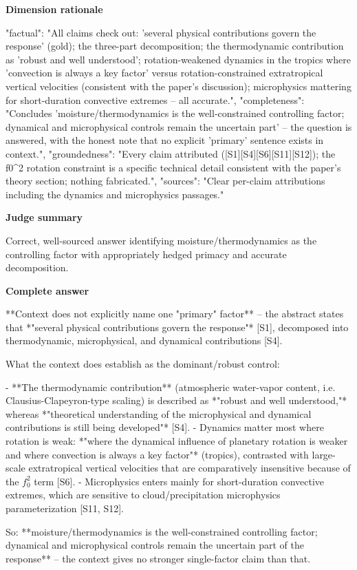 \documentclass[10pt]{article}
\begin{document}
\textbf{Dimension rationale}
\begin{EvidenceText}
{
  "factual": "All claims check out: 'several physical contributions govern the response' (gold); the three-part decomposition; the thermodynamic contribution as 'robust and well understood'; rotation-weakened dynamics in the tropics where 'convection is always a key factor' versus rotation-constrained extratropical vertical velocities (consistent with the paper's discussion); microphysics mattering for short-duration convective extremes -- all accurate.",
  "completeness": "Concludes 'moisture/thermodynamics is the well-constrained controlling factor; dynamical and microphysical controls remain the uncertain part' -- the question is answered, with the honest note that no explicit 'primary' sentence exists in context.",
  "groundedness": "Every claim attributed ([S1][S4][S6][S11][S12]); the f0^2 rotation constraint is a specific technical detail consistent with the paper's theory section; nothing fabricated.",
  "sources": "Clear per-claim attributions including the dynamics and microphysics passages."
}
\end{EvidenceText}

\textbf{Judge summary}
\begin{EvidenceText}
Correct, well-sourced answer identifying moisture/thermodynamics as the controlling factor with appropriately hedged primacy and accurate decomposition.
\end{EvidenceText}

\textbf{Complete answer}
\begin{AnswerText}
**Context does not explicitly name one "primary" factor** -- the abstract states that *"several physical contributions govern the response"* [S1], decomposed into thermodynamic, microphysical, and dynamical contributions [S4].

What the context does establish as the dominant/robust control:

- **The thermodynamic contribution** (atmospheric water-vapor content, i.e. Clausius-Clapeyron-type scaling) is described as *"robust and well understood,"* whereas *"theoretical understanding of the microphysical and dynamical contributions is still being developed"* [S4].
- Dynamics matter most where rotation is weak: *"where the dynamical influence of planetary rotation is weaker and where convection is always a key factor"* (tropics), contrasted with large-scale extratropical vertical velocities that are comparatively insensitive because of the $f_0^2$ term [S6].
- Microphysics enters mainly for short-duration convective extremes, which are sensitive to cloud/precipitation microphysics parameterization [S11, S12].

So: **moisture/thermodynamics is the well-constrained controlling factor; dynamical and microphysical controls remain the uncertain part of the response** -- the context gives no stronger single-factor claim than that.
\end{AnswerText}
\end{document}
